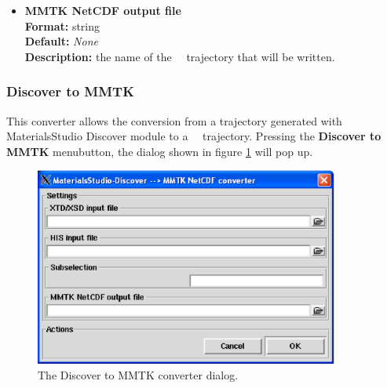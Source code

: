 \documentclass[a4paper,11pt]{report}
\begin{document}
\begin{itemize}
\hypertarget{dlpoly_converter_mmtk_netcdf_output_file}{}
\item \textbf{MMTK NetCDF output file}\\
\textbf{Format:} string\\
\textbf{Default:} \textit{None}\\
\textbf{Description:} the name of the \MMTK\ \NetCDF\ trajectory that will be written.
\end{itemize}

\subsubsection{Discover to MMTK}
\label{discover_to_mmtk}
This converter allows the conversion from a trajectory generated with MaterialsStudio Discover module \cite{Discover} to a 
\MMTK\ \NetCDF\ trajectory. Pressing the \textbf{Discover to MMTK} menubutton, the dialog shown in figure \ref{fig:discover_converter} will pop up.
\newpage
\begin{figure}[h!]
\begin{center}
\includegraphics[width=10cm]{Figures/discover_converter.eps}
\end{center}
\caption[The Discover to MMTK converter dialog]{The Discover to MMTK converter dialog.}
\label{fig:discover_converter}
\end{figure}   
\end{document}
